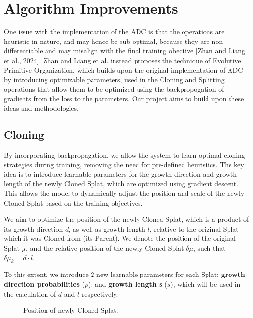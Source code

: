 \documentclass[11pt]{report}
\begin{document}
\section{Algorithm Improvements}
One issue with the implementation of the ADC is that the operations are heuristic in nature, and may hence be sub-optimal, because they are non-differentiable and may misalign with the final training obective [Zhan and Liang et al., 2024]. Zhan and Liang et al. instead proposes the technique of Evolutive Primitive Organization, which builds upon the original implementation of ADC by introducing optimizable parameters, used in the Cloning and Splitting operations that allow them to be optimized using the backpropogation of gradients from the loss to the parameters. Our project aims to build upon these ideas and methodologies.

\subsection{Cloning}

By incorporating backpropagation, we allow the system to learn optimal cloning strategies during training, removing the need for pre-defined heuristics. The key idea is to introduce learnable parameters for the growth direction and growth length of the newly Cloned Splat, which are optimized using gradient descent. This allows the model to dynamically adjust the position and scale of the newly Cloned Splat based on the training objectives.

We aim to optimize the position of the newly Cloned Splat, which is a product of its growth direction $d$, as well as growth length $l$, relative to the original Splat which it was Cloned from (its Parent). We denote the position of the original Splat $\mu$, and the relative position of the newly Cloned Splat $\delta \mu$, such that $\delta \mu_k = d\cdot l$.

To this extent, we introduce 2 new learnable parameters for each Splat: \textbf{growth direction probabilities} ($p$), and \textbf{growth length s} ($s$), which will be used in the calculation of $d$ and $l$ respectively.

\begin{figure}[H]
    \centering
    
    \caption{Position of newly Cloned Splat.}
    \label{fig:clone}
\end{figure}
\end{document}
